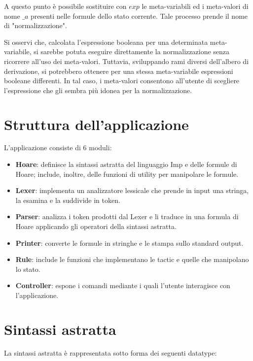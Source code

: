 \documentclass[]{article}
\begin{document}
\par
A questo punto \`e possibile sostituire con $exp$ le meta-variabili ed i meta-valori di nome $\_a$ presenti nelle formule dello stato corrente. Tale processo prende il nome di "normalizzazione".
\par
Si osservi che, calcolata l'espressione booleana per una determinata meta-variabile, si sarebbe potuta eseguire direttamente la normalizzazione senza ricorrere all'uso dei meta-valori. Tuttavia, sviluppando rami diversi dell'albero di derivazione, si potrebbero ottenere per una stessa meta-variabile espressioni booleane differenti. In tal caso, i meta-valori consentono all'utente di scegliere l'espressione che gli sembra pi\`u idonea per la normalizzazione.

\section{Struttura dell'applicazione}
L'applicazione consiste di 6 moduli:
\begin{itemize}
	\item \textbf{Hoare}: definisce la sintassi astratta del linguaggio Imp e delle formule di Hoare; include, inoltre, delle funzioni di utility per manipolare le formule.
    \item \textbf{Lexer}: implementa un analizzatore lessicale che prende in input una stringa, la esamina e la suddivide in token.
    \item \textbf{Parser}: analizza i token prodotti dal Lexer e li traduce in una formula di Hoare applicando gli operatori della sintassi astratta.
    \item \textbf{Printer}: converte le formule in stringhe e le stampa sullo standard output.
    \item \textbf{Rule}: include le funzioni che implementano le tactic e quelle che manipolano lo stato. 
    \item \textbf{Controller}: espone i comandi mediante i quali l'utente interagisce con l'applicazione.
\end{itemize}

\section{Sintassi astratta}
La sintassi astratta \`e rappresentata sotto forma dei seguenti datatype:
 
\end{document}

